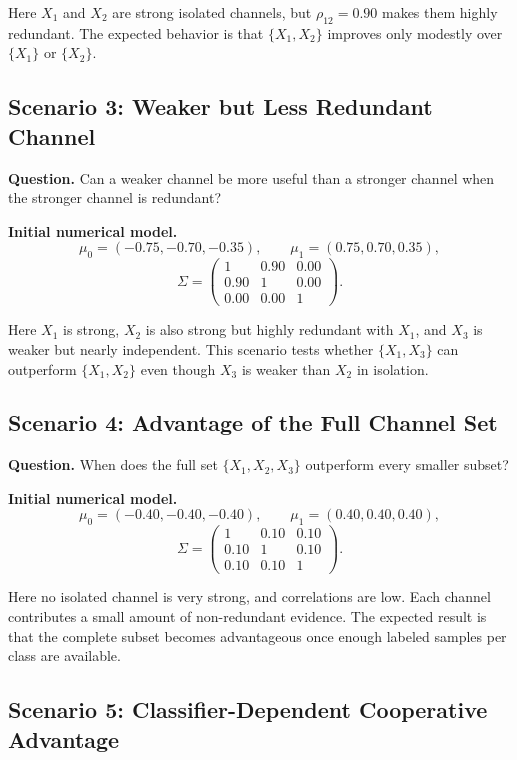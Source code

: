\documentclass[11pt,a4paper]{article}
\begin{document}
Here $X_1$ and $X_2$ are strong isolated channels, but $\rho_{12}=0.90$ makes them highly redundant. The expected behavior is that $\{X_1,X_2\}$ improves only modestly over $\{X_1\}$ or $\{X_2\}$.

\subsection{Scenario 3: Weaker but Less Redundant Channel}

\textbf{Question.} Can a weaker channel be more useful than a stronger channel when the stronger channel is redundant?

\textbf{Initial numerical model.}
\[
    \mu_0=(-0.75,-0.70,-0.35),
    \qquad
    \mu_1=(0.75,0.70,0.35),
\]
\[
\Sigma=
\begin{pmatrix}
1 & 0.90 & 0.00\\
0.90 & 1 & 0.00\\
0.00 & 0.00 & 1
\end{pmatrix}.
\]

Here $X_1$ is strong, $X_2$ is also strong but highly redundant with $X_1$, and $X_3$ is weaker but nearly independent. This scenario tests whether $\{X_1,X_3\}$ can outperform $\{X_1,X_2\}$ even though $X_3$ is weaker than $X_2$ in isolation.

\subsection{Scenario 4: Advantage of the Full Channel Set}

\textbf{Question.} When does the full set $\{X_1,X_2,X_3\}$ outperform every smaller subset?

\textbf{Initial numerical model.}
\[
    \mu_0=(-0.40,-0.40,-0.40),
    \qquad
    \mu_1=(0.40,0.40,0.40),
\]
\[
\Sigma=
\begin{pmatrix}
1 & 0.10 & 0.10\\
0.10 & 1 & 0.10\\
0.10 & 0.10 & 1
\end{pmatrix}.
\]

Here no isolated channel is very strong, and correlations are low. Each channel contributes a small amount of non-redundant evidence. The expected result is that the complete subset becomes advantageous once enough labeled samples per class are available.

\subsection{Scenario 5: Classifier-Dependent Cooperative Advantage}
\end{document}
